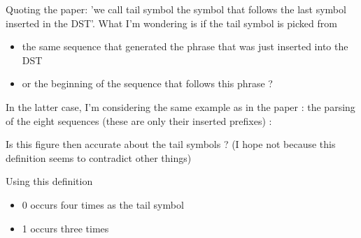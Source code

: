 


Quoting the paper: 'we call tail symbol the 
symbol that follows the last symbol inserted in the DST'.
What I'm wondering is if the tail symbol is picked from
\begin{itemize}
  \item the same sequence that generated the phrase that was 
        just inserted into the DST
  \item or the beginning of the sequence that follows this phrase ?
\end{itemize}

In the latter case, I'm considering the same example as in 
the paper : the parsing of the eight sequences (these are only their inserted prefixes) :


Is this figure then accurate about the tail symbols ? (I hope not
because this definition seems to contradict other things)

Using this definition
  \begin{itemize}
    \item 0 occurs four times as the tail symbol
    \item 1 occurs three times
  \end{itemize}
  
